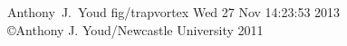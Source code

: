 \documentclass[12pt]{report}
\begin{document}
              {Anthony~J.~Youd}
              {fig/trapvortex}
              {\small{Wed 27 Nov 14:23:53 2013}\\
               \tiny{\copyright Anthony J. Youd/Newcastle University 2011}}


  


  \tableofcontents

  \clearpage


  
  
  
  
  

  \appendix

  

  
  
\end{document}

